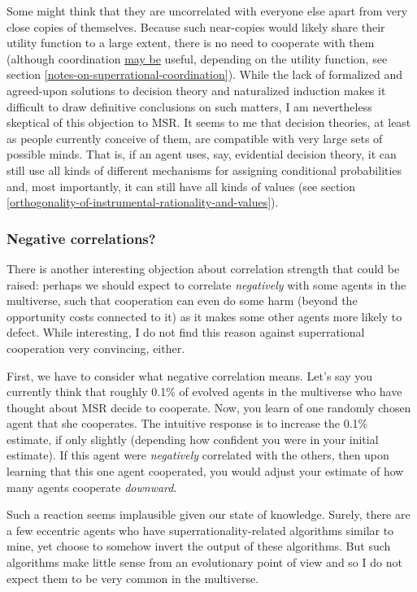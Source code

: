 Some might think that they are uncorrelated with everyone else apart
from very close copies of themselves. Because such near-copies would
likely share their utility function to a large extent, there is no need
to cooperate with them (although coordination
\protect\hyperlink{notes-on-superrational-coordination}{may be} useful,
depending on the utility function, see section
\ref{notes-on-superrational-coordination}). While the lack of formalized and
agreed-upon solutions to decision theory and naturalized induction
\parencite{Soares2014-hg,Soares2015-hu} makes it difficult
to draw definitive conclusions on such matters, I am nevertheless
skeptical of this objection to MSR. It seems to me that decision
theories, at least as people currently conceive of them, are compatible
with very large sets of possible minds. That is, if an agent uses, say,
evidential decision theory, it can still use all kinds of different
mechanisms for assigning conditional probabilities and, most
importantly, it can still have all kinds of values (see section
\ref{orthogonality-of-instrumental-rationality-and-values}).

\hypertarget{negative-correlations}{\subsubsection{Negative
correlations?}\label{negative-correlations}}

There is another interesting objection about correlation strength that
could be raised: perhaps we should expect to correlate \emph{negatively}
with some agents in the multiverse, such that cooperation can even do
some harm (beyond the opportunity costs connected to it) as it makes
some other agents more likely to defect. While interesting, I do not
find this reason against superrational cooperation very convincing,
either.

First, we have to consider what negative correlation means. Let's say
you currently think that roughly 0.1\% of evolved agents in the
multiverse who have thought about MSR decide to cooperate. Now, you
learn of one randomly chosen agent that she cooperates. The intuitive
response is to increase the 0.1\% estimate, if only slightly (depending
how confident you were in your initial estimate). If this agent were
\emph{negatively} correlated with the others, then upon learning that
this one agent cooperated, you would adjust your estimate of how many
agents cooperate \emph{downward}.

Such a reaction seems implausible given our state of knowledge. Surely,
there are a few eccentric agents who have superrationality-related
algorithms similar to mine, yet choose to somehow invert the output of
these algorithms. But such algorithms make little sense from an
evolutionary point of view and so I do not expect them to be very common
in the multiverse.

